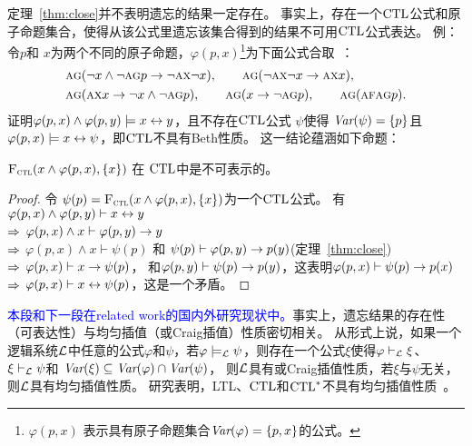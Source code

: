 定理~\ref{thm:close}并不表明遗忘的结果一定存在。
事实上，存在一个$\textrm{CTL}$公式和原子命题集合，使得从该公式里遗忘该集合得到的结果不可用$\textrm{CTL}$公式表达。
例：令$p$和 $x$为两个不同的原子命题，$\varphi(p,x)$\footnote{$\varphi(p,x)$ 表示具有原子命题集合$\textit{Var}(\varphi)=\{p,x\}$的公式。}为下面公式合取~\cite{Maksimova:JANCL:1991}：
\begin{align*}
	&\textsc{a}\textsc{g}(\neg x \wedge \neg \textsc{a} \textsc{g} p \rightarrow \neg \textsc{a} \textsc{x} \neg x),
	\qquad \textsc{a}\textsc{g}(\neg \textsc{a}\textsc{x} \neg x \rightarrow \textsc{a} \textsc{x} x),\\
	& \textsc{a}\textsc{g}(\textsc{a}\textsc{x} x \rightarrow \neg x \wedge \neg \textsc{a} \textsc{g} p),
	\qquad \textsc{a}\textsc{g}(x \rightarrow \neg \textsc{a}\textsc{g} p),
	\qquad \textsc{a}\textsc{g}(\textsc{a} \textsc{f} \textsc{a} \textsc{g} p).
\end{align*}
\citeauthor{Maksimova:JANCL:1991}证明$\varphi(p,x)\land \varphi(p,y)\models x\leftrightarrow y$，且不存在$\textrm{CTL}$公式 $\psi$使得 $\textit{Var}(\psi)=\{p\}$且$\varphi(p,x)\models x\leftrightarrow \psi$，即$\textrm{CTL}$不具有Beth性质。
这一结论蕴涵如下命题：
\begin{proposition}\label{pro:uniforget}
	${\textsc{F}_{\textsc{ctl}}}(x\land \varphi(p,x), \{x\})$ 在 $\textrm{CTL}$中是不可表示的。
\end{proposition}
\begin{proof}
	令 $\psi(p)={\textsc{F}_{\textsc{ctl}}}(x\land \varphi(p,x), \{x\})$为一个$\textrm{CTL}$公式。
	有 \\
	$\varphi(p,x)\land \varphi(p,y)\vdash x\leftrightarrow y$\\
	$\Rightarrow$ $\varphi(p,x)\land x \vdash \varphi(p,y)\rightarrow y$\\
	$\Rightarrow$ $\varphi(p,x)\land x\vdash \psi(p)$ 和 $\psi(p)\vdash \varphi(p,y)\rightarrow p(y)$\hfill (定理~\ref{thm:close})\\
	$\Rightarrow$ $\varphi(p,x)\vdash x\rightarrow\psi(p)$， 和$\varphi(p,y)\vdash \psi(p)\rightarrow p(y)$，这表明$\varphi(p,x)\vdash \psi(p)\rightarrow p(x)$\\
	$\Rightarrow$ $\varphi(p,x)\vdash x\leftrightarrow \psi(p)$，这是一个矛盾。
\end{proof}

\textcolor{blue}{本段和下一段在related work的国内外研究现状中。}事实上，遗忘结果的存在性（可表达性）与均匀插值（或Craig插值）性质密切相关。
从形式上说，如果一个逻辑系统${\cal L}$中任意的公式$\varphi$和$\psi$，若$\varphi\models_{\cal L} \psi$，则存在一个公式$\xi$使得$\varphi\vdash_{\cal L}\xi$、$\xi\vdash_{\cal L}\psi$和 $\textit{Var}(\xi)\subseteq \textit{Var}(\varphi)\cap \textit{Var}(\psi)$，
则${\cal L}$具有或Craig插值性质，若$\xi$与$\psi$无关，则${\cal L}$具有均匀插值性质。
研究表明，LTL、$\textrm{CTL}$和$\textrm{CTL}^*$不具有均匀插值性质~\cite{Maksimova:JANCL:1991,DAgostino:synthese:2008}。


